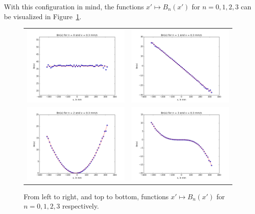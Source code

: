 \documentclass[9pt,technote]{IEEEtran}
\numberwithin{equation}{section}
\begin{document}
With this configuration in mind, the functions $x' \mapsto B_n(x')$ for $n = 0,1,2,3$ can be visualized in Figure~\ref{fig:Bnx}.
\begin{figure}[!ht]
	\centering
	\begin{tabular}{cc}
	\includegraphics[width=8cm]{figs/B0.png} &
	\includegraphics[width=8cm]{figs/B1.png} \\
	\includegraphics[width=8cm]{figs/B2.png} &
	\includegraphics[width=8cm]{figs/B3.png} 
	\end{tabular}
	\caption{From left to right, and top to bottom, functions $x' \mapsto B_n(x')$ for $n = 0,1,2,3$ respectively.\label{fig:Bnx}}
\end{figure}





\end{document}
